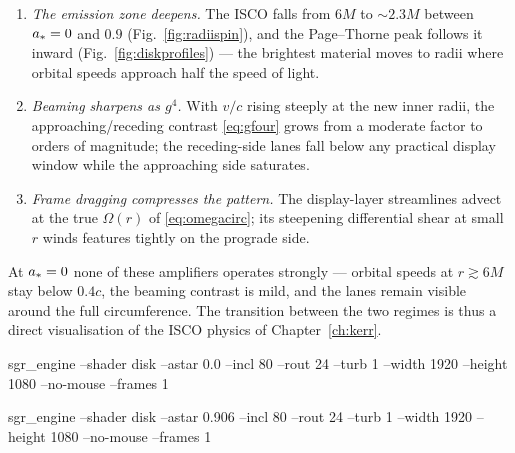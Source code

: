 \begin{enumerate}
\item \emph{The emission zone deepens.} The ISCO falls from $6M$ to
$\sim 2.3M$ between $a_* = 0$ and $0.9$
(Fig.~\ref{fig:radiispin}), and the Page--Thorne peak follows it
inward (Fig.~\ref{fig:diskprofiles}) — the brightest material moves to
radii where orbital speeds approach half the speed of light.
\item \emph{Beaming sharpens as $g^4$.} With $v/c$ rising steeply at
the new inner radii, the approaching/receding contrast
\eqref{eq:gfour} grows from a moderate factor to orders of magnitude;
the receding-side lanes fall below any practical display window while
the approaching side saturates.
\item \emph{Frame dragging compresses the pattern.} The display-layer
streamlines advect at the true $\Omega(r)$ of \eqref{eq:omegacirc};
its steepening differential shear at small $r$ winds features tightly
on the prograde side.
\end{enumerate}

At $a_* = 0$ none of these amplifiers operates strongly — orbital
speeds at $r \gtrsim 6M$ stay below $0.4c$, the beaming contrast is
mild, and the lanes remain visible around the full circumference. The
transition between the two regimes is thus a direct visualisation of
the ISCO physics of Chapter~\ref{ch:kerr}.

%
{sgr\_engine --shader disk --astar 0.0 --incl 80 --rout 24 --turb 1
--width 1920 --height 1080 --no-mouse --frames 1}

%
{sgr\_engine --shader disk --astar 0.906 --incl 80 --rout 24 --turb 1
--width 1920 --height 1080 --no-mouse --frames 1}
